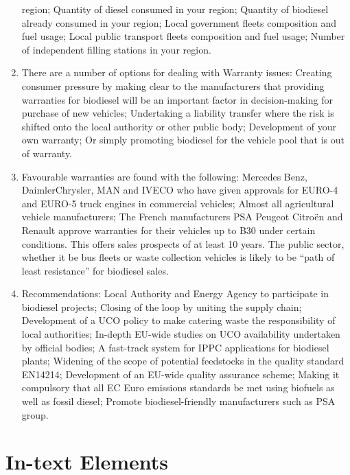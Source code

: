 \documentclass[11pt,fleqn]{book} %
\begin{document}
\begin{enumerate}
	region; Quantity of diesel consumed in your region; Quantity of biodiesel already
	consumed in your region; Local government fleets composition and fuel usage; Local
	public transport fleets composition and fuel usage; Number of independent filling stations
	in your region.
	\item There are a number of options for dealing with Warranty issues: Creating consumer
	pressure by making clear to the manufacturers that providing warranties for biodiesel will
	be an important factor in decision-making for purchase of new vehicles; Undertaking a
	liability transfer where the risk is shifted onto the local authority or other public body;
	Development of your own warranty; Or simply promoting biodiesel for the vehicle pool
	that is out of warranty.
	\item Favourable warranties are found with the following: Mercedes Benz, DaimlerChrysler,
	MAN and IVECO who have given approvals for EURO-4 and EURO-5 truck engines in
	commercial vehicles; Almost all agricultural vehicle manufacturers; The French
	manufacturers PSA Peugeot Citroën and Renault approve warranties for their vehicles up
	to B30 under certain conditions. This offers sales prospects of at least 10 years. The
	public sector, whether it be bus fleets or waste collection vehicles is likely to be “path of
	least resistance” for biodiesel sales.
	\item Recommendations: Local Authority and Energy Agency to participate in biodiesel
	projects; Closing of the loop by uniting the supply chain; Development of a UCO policy to
	make catering waste the responsibility of local authorities; In-depth EU-wide studies on
	UCO availability undertaken by official bodies; A fast-track system for IPPC applications
	for biodiesel plants; Widening of the scope of potential feedstocks in the quality standard
	EN14214; Development of an EU-wide quality assurance scheme; Making it compulsory
	that all EC Euro emissions standards be met using biofuels as well as fossil diesel;
	Promote biodiesel-friendly manufacturers such as PSA group.
\end{enumerate}



\chapter{In-text Elements}
\end{document}
